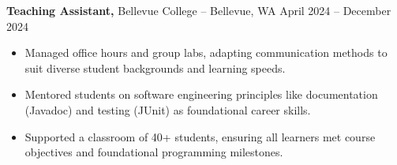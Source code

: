 \documentclass[11pt]{article}       %
\begin{document}

\textbf{Teaching Assistant,} {Bellevue College} -- Bellevue, WA \hfill April 2024 -- December 2024 \\
\vspace{-9pt}
\begin{itemize}
  \item Managed office hours and group labs, adapting communication methods to suit diverse student backgrounds and learning speeds.
  \item Mentored students on software engineering principles like documentation (Javadoc) and testing (JUnit) as foundational career skills.
  \item Supported a classroom of 40+ students, ensuring all learners met course objectives and foundational programming milestones.
\end{itemize}

\end{document}
